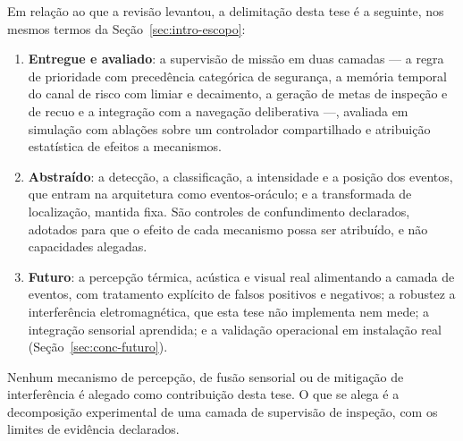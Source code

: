 Em relação ao que a revisão levantou, a delimitação desta tese é a seguinte, nos mesmos
termos da Seção~\ref{sec:intro-escopo}:

\begin{enumerate}
    \item \textbf{Entregue e avaliado}: a supervisão de missão em duas camadas --- a
    regra de prioridade com precedência categórica de segurança, a memória temporal do
    canal de risco com limiar e decaimento, a geração de metas de inspeção e de recuo e
    a integração com a navegação deliberativa ---, avaliada em simulação com ablações
    sobre um controlador compartilhado e atribuição estatística de efeitos a mecanismos.

    \item \textbf{Abstraído}: a detecção, a classificação, a intensidade e a posição
    dos eventos, que entram na arquitetura como eventos-oráculo; e a transformada de
    localização, mantida fixa. São controles de confundimento declarados, adotados para
    que o efeito de cada mecanismo possa ser atribuído, e não capacidades alegadas.

    \item \textbf{Futuro}: a percepção térmica, acústica e visual real alimentando a
    camada de eventos, com tratamento explícito de falsos positivos e negativos; a
    robustez a interferência eletromagnética, que esta tese não implementa nem mede; a
    integração sensorial aprendida; e a validação operacional em instalação real
    (Seção~\ref{sec:conc-futuro}).
\end{enumerate}

Nenhum mecanismo de percepção, de fusão sensorial ou de mitigação de interferência é
alegado como contribuição desta tese. O que se alega é a decomposição experimental de
uma camada de supervisão de inspeção, com os limites de evidência declarados.
